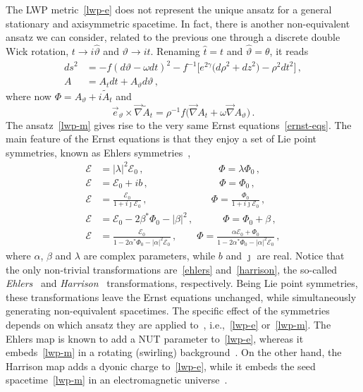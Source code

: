 \documentclass[aps,preprint,groupedaddress,nofootinbib,superscriptaddress,showkeys,showpacs,eqsecnum,amsmath,amssymb]{revtex4-1}
\newcommand{\ernst}{\mathcal{E}}
\begin{document}
The LWP metric~\eqref{lwp-e} does not represent the unique ansatz for a general stationary and axisymmetric spacetime. In fact, there is another non-equivalent ansatz we can consider, related to the previous one through a discrete double Wick rotation, $t \to i \hat{\vartheta}$ and $\vartheta \to i\hat{t}$. Renaming $\hat{t}=t$ and $\hat{\vartheta}=\theta$, it reads 
\begin{subequations}
\label{lwp-m}
\begin{align}
{ds}^2 & =
-f (d\vartheta - \omega dt)^2
- f^{-1} \bigl[ e^{2\gamma} \bigl( {d\rho}^2 + {dz}^2 \bigr)
- \rho^2 {dt}^2 \bigr] \,, \\
A & = A_t dt + A_\vartheta d\vartheta \,,
\end{align}
\end{subequations}
where now $\Phi = A_\vartheta+ i\tilde{A}_t$ and
\begin{equation}
\label{At}
\vec{e}_{\vartheta} \times \vec\nabla \tilde{A}_t =
\rho^{-1} f \bigl( \vec\nabla A_t + \omega \vec\nabla A_\vartheta \bigr) \,.
\end{equation}
The ansatz~\eqref{lwp-m} gives rise to the very same Ernst equations~\eqref{ernst-eqs}. The main feature of the 
Ernst equations is that they enjoy a set of Lie point symmetries, known as Ehlers symmetries~\cite{Stephani:2003tm},
\begin{subequations}
\label{ernst-group}
\begin{align}
\label{gauge1}
\ernst & = |\lambda|^2 \ernst_0 \,, \qquad\qquad\qquad\quad\;\;
\Phi = \lambda \Phi_0 \,, \\
\label{gauge2}
\ernst & = \ernst_0 + ib \,, \qquad\qquad\qquad\quad\,
\Phi = \Phi_0 \,, \\
\label{ehlers}
\ernst & = \frac{\ernst_0}{1 + i\jmath\ernst_0} \,, \qquad\qquad\qquad\;\,
\Phi = \frac{\Phi_0}{1 + i\jmath\ernst_0} \,, \\
\label{gauge3}
\ernst & = \ernst_0 - 2\beta^*\Phi_0 - |\beta|^2 \,, \qquad\quad\!
\Phi = \Phi_0 + \beta \,, \\
\label{harrison}
\ernst & = \frac{\ernst_0}{1 - 2\alpha^*\Phi_0 - |\alpha|^2\ernst_0} \,, \qquad
\Phi = \frac{\alpha\ernst_0 + \Phi_0}{1 - 2\alpha^*\Phi_0 - |\alpha|^2\ernst_0} \,,
\end{align}
\end{subequations}
where $\alpha$, $\beta$ and $\lambda$ are complex parameters, while $b$ and $\jmath$ are real.
Notice that the only non-trivial transformations are~\eqref{ehlers} and~\eqref{harrison}, the so-called \emph{Ehlers}~\cite{Ehlers:1957zz} and \emph{Harrison}~\cite{Harrison:1968} transformations, respectively. Being Lie point symmetries, these transformations leave the Ernst equations unchanged, while simultaneously generating non-equivalent spacetimes. The specific effect of the symmetries depends on which ansatz they are applied to~\cite{Vigano:2022hrg}, i.e.,~\eqref{lwp-e} or~\eqref{lwp-m}. The Ehlers map is known to add a NUT parameter to~\eqref{lwp-e}, whereas it embeds~\eqref{lwp-m} in a rotating (swirling) background~\cite{Astorino:2022aam}. On the other hand, the Harrison map adds a dyonic charge to~\eqref{lwp-e}, while it embeds the seed spacetime~\eqref{lwp-m} in an electromagnetic universe~\cite{Ernst:1976mzr}.
\end{document}
